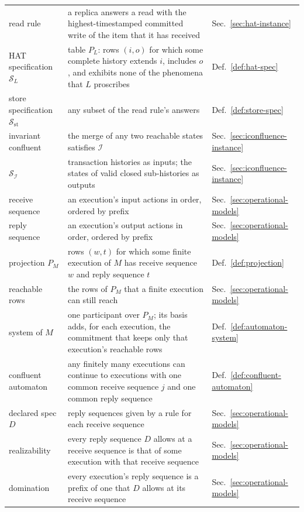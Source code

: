 \documentclass[sigconf]{cidr-2027}
\theoremstyle{remark}
\newcommand{\commitment}{commitment\xspace}
\newcommand{\Spec}{\mathcal{S}}
\begin{document}
{\medskip
\noindent
\begin{tabular}{@{}>{\raggedright\arraybackslash}p{}>{\raggedright\arraybackslash}p{}>{\raggedright\arraybackslash}p{}@{}}
  \toprule
  \multicolumn{3}{@{}l}{\textbf{Related work and mappings (\S\ref{sec:instances})}}\\
  \midrule
  read rule & a replica answers a read with the highest-timestamped committed write of the item that it has received & Sec.~\ref{sec:hat-instance}\\
  HAT specification $\Spec_L$ & table $P_L$: rows $(i,o)$ for which some complete history extends $i$, includes $o$, and exhibits none of the phenomena that $L$ proscribes & Def.~\ref{def:hat-spec}\\
  store specification $\Spec_{\mathrm{st}}$ & any subset of the read rule's answers & Def.~\ref{def:store-spec}\\
  invariant confluent & the merge of any two reachable states satisfies $\mathcal I$ & Sec.~\ref{sec:iconfluence-instance}\\
  $\Spec_{\mathcal I}$ & transaction histories as inputs; the states of valid closed sub-histories as outputs & Sec.~\ref{sec:iconfluence-instance}\\
  receive sequence & an execution's input actions in order, ordered by prefix & Sec.~\ref{sec:operational-models}\\
  reply sequence & an execution's output actions in order, ordered by prefix & Sec.~\ref{sec:operational-models}\\
  projection $P_M$ & rows $(w,t)$ for which some finite execution of $M$ has receive sequence $w$ and reply sequence $t$ & Def.~\ref{def:projection}\\
  reachable rows & the rows of $P_M$ that a finite execution can still reach & Sec.~\ref{sec:operational-models}\\
  system of $M$ & one participant over $P_M$; its basis adds, for each execution, the \commitment that keeps only that execution's reachable rows & Def.~\ref{def:automaton-system}\\
  confluent automaton & any finitely many executions can continue to executions with one common receive sequence $j$ and one common reply sequence & Def.~\ref{def:confluent-automaton}\\
  declared spec $D$ & reply sequences given by a rule for each receive sequence & Sec.~\ref{sec:operational-models}\\
  realizability & every reply sequence $D$ allows at a receive sequence is that of some execution with that receive sequence & Sec.~\ref{sec:operational-models}\\
  domination & every execution's reply sequence is a prefix of one that $D$ allows at its receive sequence & Sec.~\ref{sec:operational-models}\\
  \bottomrule
\end{tabular}
}
\end{document}
